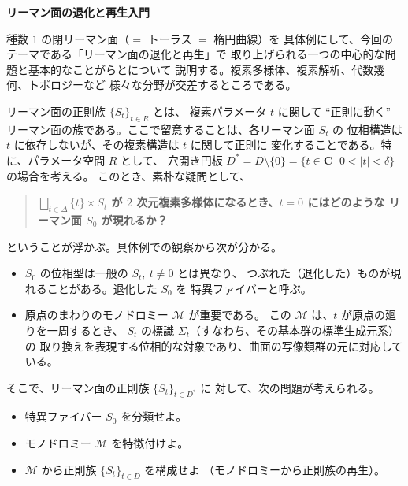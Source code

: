 \documentclass[uplatex,dvipdfmx]{jlreq}
\begin{document}
\begin{center}
{\Large\bfseries リーマン面の退化と再生入門}

\hspace*{\fill}{\large\bfseries 今吉 洋一（大阪市立大・理）}
\end{center}

\bigskip

種数 $1$ の閉リーマン面（$=$ トーラス $=$ 楕円曲線）を
具体例にして、今回のテーマである「リーマン面の退化と再生」で
取り上げられる一つの中心的な問題と基本的なことがらとについて
説明する。複素多様体、複素解析、代数幾何、トポロジーなど
様々な分野が交差するところである。

リーマン面の正則族 $\{S_t\}_{t\in R}$ とは、
複素パラメータ $t$ に関して ``正則に動く''
リーマン面の族である。ここで留意することは、各リーマン面 $S_t$ の
位相構造は $t$ に依存しないが、その複素構造は $t$ に関して正則に
変化することである。特に、パラメータ空間 $R$ として、
穴開き円板 $D^* = D \setminus \{0\} =
\{ t \in {\mathbf C} \, | \, 0 < |t| < \delta\}$ の場合を考える。
このとき、素朴な疑問として、
\medskip
\begin{quote}
\bfseries $\bigsqcup_{t \in \Delta} \{t\} \times S_t$
が $2$ 次元複素多様体になるとき、$t=0$ にはどのような
リーマン面 $S_0$ が現れるか？
\end{quote}
\medskip
ということが浮かぶ。具体例での観察から次が分かる。
\begin{itemize}
\item $S_0$ の位相型は一般の $S_t,\ t \neq 0$ とは異なり、
つぶれた（退化した）ものが現れることがある。退化した $S_0$ を
特異ファイバーと呼ぶ。
\item 原点のまわりのモノドロミー $\mathcal{M}$ が重要である。
この $\mathcal{M}$ は、$t$ が原点の廻りを一周するとき、
$S_t$ の標識 $\Sigma_t$（すなわち、その基本群の標準生成元系）の
取り換えを表現する位相的な対象であり、曲面の写像類群の元に対応している。
\end{itemize}
そこで、リーマン面の正則族 $\{S_t\}_{t\in D^*}$ に
対して、次の問題が考えられる。
\begin{itemize}
\item 特異ファイバー $S_0$ を分類せよ。
\item モノドロミー $\mathcal{M}$ を特徴付けよ。
\item $\mathcal{M}$ から正則族 $\{S_t\}_{t\in D}$ を構成せよ
（モノドロミーから正則族の再生）。
\end{itemize}
\end{document}
